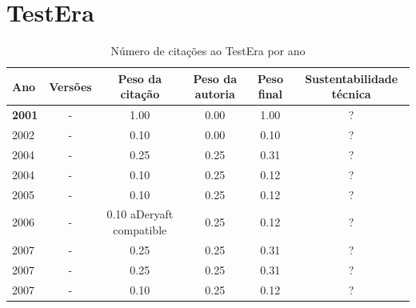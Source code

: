 \section{TestEra}



\begin{table}[H]
\caption{Número de citações ao TestEra por ano}
\centering
\begin{tabular}{| l | c | c | c | c | c |}
  \hline
  Ano & Versões & Peso da citação & Peso da autoria & Peso final & Sustentabilidade técnica \\
  \hline
            {\bf 2001}
          &
          -
          &
          1.00
          &
          0.00
          &
            {\color{blue} 1.00}
          &
          ?
          \\
\hline
            2002
          &
          -
          &
          0.10
          &
          0.00
          &
            {\color{red} 0.10}
          &
          ?
          \\
\hline
            2004
          &
          -
          &
          0.25
          &
          0.25
          &
            {\color{red} 0.31}
          &
          ?
          \\
            2004
          &
          -
          &
          0.10
          &
          0.25
          &
            {\color{red} 0.12}
          &
          ?
          \\
\hline
            2005
          &
          -
          &
          0.10
          &
          0.25
          &
            {\color{red} 0.12}
          &
          ?
          \\
\hline
            2006
          &
          -
          &
          0.10
            {\tiny aDeryaft compatible}
          &
          0.25
          &
            {\color{red} 0.12}
          &
          ?
          \\
\hline
            2007
          &
          -
          &
          0.25
          &
          0.25
          &
            {\color{red} 0.31}
          &
          ?
          \\
            2007
          &
          -
          &
          0.25
          &
          0.25
          &
            {\color{red} 0.31}
          &
          ?
          \\
            2007
          &
          -
          &
          0.10
          &
          0.25
          &
            {\color{red} 0.12}
          &
          ?
          \\

\end{tabular}
\end{table}
